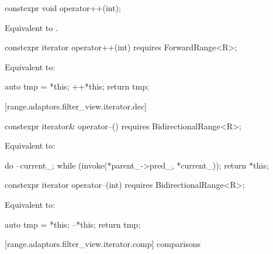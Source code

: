 \begin{addedblock}
%
\begin{itemdecl}
constexpr void operator++(int);
\end{itemdecl}

\begin{itemdescr}
\pnum
\effects Equivalent to .
\end{itemdescr}

%
\begin{itemdecl}
constexpr iterator operator++(int) requires ForwardRange<R>;
\end{itemdecl}

\begin{itemdescr}
\pnum
\effects Equivalent to:
\begin{codeblock}
auto tmp = *this;
++*this;
return tmp;
\end{codeblock}
\end{itemdescr}

[range.adaptors.filter_view.iterator.dec]{}

%
\begin{itemdecl}
constexpr iterator& operator--() requires BidirectionalRange<R>;
\end{itemdecl}

\begin{itemdescr}
\pnum
\effects Equivalent to:
\begin{codeblock}
do
  --current_;
while (invoke(*parent_->pred_, *current_));
return *this;
\end{codeblock}
\end{itemdescr}

%
\begin{itemdecl}
constexpr iterator operator--(int) requires BidirectionalRange<R>;
\end{itemdecl}

\begin{itemdescr}
\pnum
\effects Equivalent to:
\begin{codeblock}
auto tmp = *this;
--*this;
return tmp;
\end{codeblock}
\end{itemdescr}

[range.adaptors.filter_view.iterator.comp]{ comparisons}


\end{addedblock}
